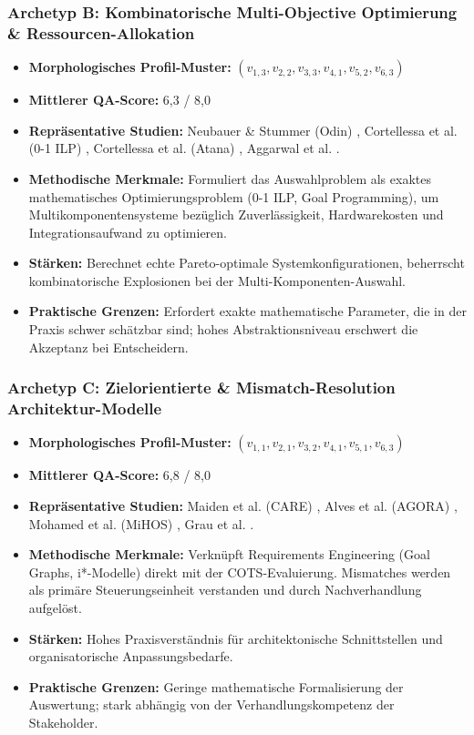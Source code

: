 \subsubsection{Archetyp B: Kombinatorische Multi-Objective Optimierung \& Ressourcen-Allokation}
\begin{itemize}
    \item \textbf{Morphologisches Profil-Muster:} $(v_{1,3}, v_{2,2}, v_{3,3}, v_{4,1}, v_{5,2}, v_{6,3})$
    \item \textbf{Mittlerer QA-Score:} 6,3 / 8,0
    \item \textbf{Repräsentative Studien:} Neubauer \& Stummer (Odin) \cite{ZQMG69VT}, Cortellessa et al. (0-1 ILP) \cite{VUVLUN85}, Cortellessa et al. (Atana) \cite{MZ8JHDYA}, Aggarwal et al. \cite{W8P543Y2}.
    \item \textbf{Methodische Merkmale:} Formuliert das Auswahlproblem als exaktes mathematisches Optimierungsproblem (0-1 ILP, Goal Programming), um Multikomponentensysteme bezüglich Zuverlässigkeit, Hardwarekosten und Integrationsaufwand zu optimieren.
    \item \textbf{Stärken:} Berechnet echte Pareto-optimale Systemkonfigurationen, beherrscht kombinatorische Explosionen bei der Multi-Komponenten-Auswahl.
    \item \textbf{Praktische Grenzen:} Erfordert exakte mathematische Parameter, die in der Praxis schwer schätzbar sind; hohes Abstraktionsniveau erschwert die Akzeptanz bei Entscheidern.
\end{itemize}

\subsubsection{Archetyp C: Zielorientierte \& Mismatch-Resolution Architektur-Modelle}
\begin{itemize}
    \item \textbf{Morphologisches Profil-Muster:} $(v_{1,1}, v_{2,1}, v_{3,2}, v_{4,1}, v_{5,1}, v_{6,3})$
    \item \textbf{Mittlerer QA-Score:} 6,8 / 8,0
    \item \textbf{Repräsentative Studien:} Maiden et al. (CARE) \cite{TLB687YL, 6RNULWVY}, Alves et al. (AGORA) \cite{8XNYS4M9}, Mohamed et al. (MiHOS) \cite{MC9UMXZZ, 9F79VAAB}, Grau et al. \cite{DAU8NSK8}.
    \item \textbf{Methodische Merkmale:} Verknüpft Requirements Engineering (Goal Graphs, i*-Modelle) direkt mit der COTS-Evaluierung. Mismatches werden als primäre Steuerungseinheit verstanden und durch Nachverhandlung aufgelöst.
    \item \textbf{Stärken:} Hohes Praxisverständnis für architektonische Schnittstellen und organisatorische Anpassungsbedarfe.
    \item \textbf{Praktische Grenzen:} Geringe mathematische Formalisierung der Auswertung; stark abhängig von der Verhandlungskompetenz der Stakeholder.
\end{itemize}

